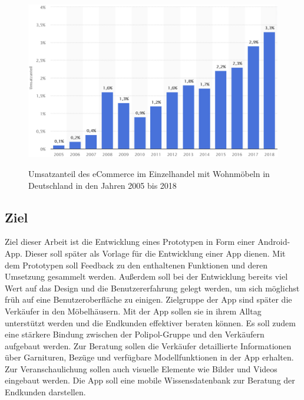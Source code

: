 \begin{figure}[hbt]
    \centering
    \begin{minipage}[t]{.9\textwidth}
        \caption{Umsatzanteil des eCommerce im Einzelhandel mit Wohnmöbeln in Deutschland in den Jahren 2005 bis 2018}
        \includegraphics[width=1\textwidth]{img/Umsatzanteil_eCommerce_Moebeleinzelhandel.PNG}\\
        \label{fig:furniture_market_ecommerce}
    \end{minipage}
\end{figure}

\subsection{Ziel}
Ziel dieser Arbeit ist die Entwicklung eines Prototypen in Form einer Android-App. Dieser soll später als Vorlage für die Entwicklung einer App dienen. Mit dem Prototypen soll Feedback zu den enthaltenen Funktionen und deren Umsetzung gesammelt werden. Außerdem soll bei der Entwicklung bereits viel Wert auf das Design und die Benutzererfahrung gelegt werden, um sich möglichst früh auf eine Benutzeroberfläche zu einigen. Zielgruppe der App sind später die Verkäufer in den Möbelhäusern. Mit der App sollen sie in ihrem Alltag unterstützt werden und die Endkunden effektiver beraten können. Es soll zudem eine stärkere Bindung zwischen der Polipol-Gruppe und den Verkäufern aufgebaut werden. Zur Beratung sollen die Verkäufer detaillierte Informationen über Garnituren, Bezüge und verfügbare Modellfunktionen in der App erhalten. Zur Veranschaulichung sollen auch visuelle Elemente wie Bilder und Videos eingebaut werden. Die App soll eine mobile Wissensdatenbank zur Beratung der Endkunden darstellen.

